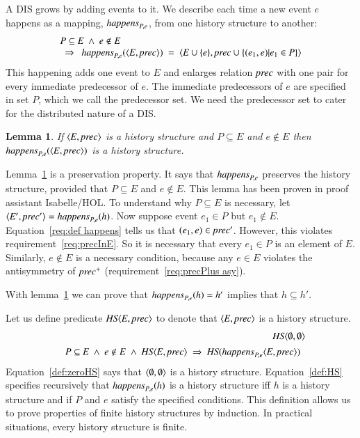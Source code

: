 \documentclass{elsarticle}
\newtheorem{lemma}{Lemma}
\def\id#1{\text{\em #1\/}}
\def\Events{{\mathit E}}
\begin{document}
	A DIS grows by adding events to it.
	We describe each time a new event $e$ happens as a mapping, $\id{happens}_{P,e}$, from one history structure to another:
\begin{equation}
\begin{array}{l}
	P\subseteq\Events\ \wedge\ e\notin E\\
	\ \ \Rightarrow\ \ \id{happens}_{P,e}(\la \Events, \id{prec}\ra)\ =\ \la \Events\cup\{e\}, \id{prec}\cup\{(e_1,e) | e_1\in P\}\ra
\end{array}
\label{req:def happens}
\end{equation}
	This happening adds one event to $\Events$ and enlarges relation $\id{prec}$ with one pair for every immediate predecessor of $e$.
	The immediate predecessors of $e$ are specified in set $P$, which we call the predecessor set.
	We need the predecessor set to cater for the distributed nature of a DIS.
\begin{lemma}
\label{lemma:happens preserves history structure}
	If $\la \Events, \id{prec}\ra$ is a history structure and $P\subseteq\Events$ and $e\notin\Events$
	then $\id{happens}_{P,e}(\la \Events, \id{prec}\ra)$ is a history structure.
\end{lemma}
	Lemma~\ref{lemma:happens preserves history structure} is a preservation property.
	It says that $\id{happens}_{P,e}$ preserves the history structure,
	provided that $P\subseteq\Events$ and $e\notin\Events$.
	This lemma has been proven in proof assistant Isabelle/HOL.
	To understand why $P\subseteq\Events$ is necessary,
	let $\la \Events', \id{prec}'\ra=\id{happens}_{P,e}(h)$.
	Now suppose event $e_1\in P$ but $e_1\notin\Events$.
	Equation~\ref{req:def happens} tells us that $(e_1,e)\in\id{prec}'$.
	However, this violates requirement~\ref{req:precInE}.
	So it is necessary that every $e_1\in P$ is an element of $\Events$.
	Similarly, $e\notin\Events$ is a necessary condition,
	because any $e\in\Events$ violates the antisymmetry of $\id{prec}^+$ (requirement~\ref{req:precPlus asy}).

	With lemma~\ref{lemma:happens preserves history structure} we can prove that $\id{happens}_{P,e}(h)=h'$ implies that $h\subseteq h'$.

	Let us define predicate $\id{HS}\la \Events, \id{prec}\ra$
	to denote that $\la \Events, \id{prec}\ra$ is a history structure.
\begin{eqnarray}
	&&\id{HS}\la \emptyset, \emptyset\ra\label{def:zeroHS}\\
&&\begin{array}{@{}l}
	P\subseteq\Events\ \wedge\ e\notin E\ \wedge\ \id{HS}\la \Events, \id{prec}\ra\ \Rightarrow\ \id{HS}(\id{happens}_{P,e}\la \Events, \id{prec}\ra)
\end{array}
\label{def:HS}
\end{eqnarray}
	Equation~\ref{def:zeroHS} says that $\langle \emptyset, \emptyset\rangle$ is a history structure.
	Equation~\ref{def:HS} specifies recursively that $\id{happens}_{P,e}(h)$ is a history structure iff
	$h$ is a history structure and if $P$ and $e$ satisfy the specified conditions.
	This definition allows us to prove properties of finite history structures by induction.
	In practical situations, every history structure is finite.
\end{document}
